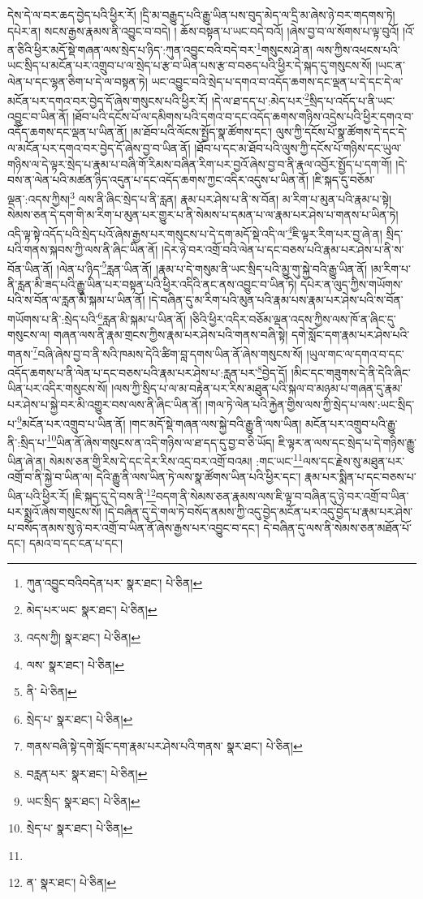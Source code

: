དེས་དེ་ལ་བར་ཆད་བྱེད་པའི་ཕྱིར་རོ། །དྲི་མ་བརྒྱུད་པའི་རྒྱུ་ཡིན་པས་བུད་མེད་ལ་དྲི་མ་ཞེས་ཉེ་བར་གདགས་ཏེ། དཔེར་ན། སངས་རྒྱས་རྣམས་ནི་འབྱུང་བ་བདེ། །
ཆོས་བསྟན་པ་ཡང་བདེ་བའོ། །ཞེས་བྱ་བ་ལ་སོགས་པ་ལྟ་བུའོ། །འོ་ན་ཅིའི་ཕྱིར་མདོ་སྡེ་གཞན་ལས་སྲེད་པ་ཉིད་:ཀུན་འབྱུང་བའི་བདེ་བར་\footnote{ཀུན་འབྱུང་བའིབདེན་པར་  སྣར་ཐང་།  པེ་ཅིན། }གསུངས་ཤེ་ན། ལས་ཀྱིས་འཕངས་པའི་ཡང་སྲིད་པ་མངོན་པར་འགྲུབ་པ་ལ་སྲེད་པ་རྩ་བ་ཡིན་པས་རྩ་བ་བཅད་པའི་ཕྱིར་དེ་སྐད་དུ་གསུངས་སོ། །ཡང་ན་ལེན་པ་དང་ལྷན་ཅིག་པ་དེ་ལ་བསྟན་ཏེ། ཡང་འབྱུང་བའི་སྲེད་པ་དགའ་བ་འདོད་ཆགས་དང་ལྡན་པ་དེ་དང་དེ་ལ་མངོན་པར་དགའ་བར་བྱེད་དོ་ཞེས་གསུངས་པའི་ཕྱིར་རོ། །དེ་ལ་ཐ་དད་པ་:མེད་པར་\footnote{མེད་པར་ཡང་  སྣར་ཐང་།  པེ་ཅིན། }སྲིད་པ་འདོད་པ་ནི་ཡང་འབྱུང་བ་ཡིན་ནོ། །ཐོབ་པའི་དངོས་པོ་ལ་དམིགས་པའི་དགའ་བ་དང་འདོད་ཆགས་གཉིས་འདྲེས་པའི་ཕྱིར་དགའ་བ་འདོད་ཆགས་དང་ལྡན་པ་ཡིན་ནོ། །མ་ཐོབ་པའི་ལོངས་སྤྱོད་སྣ་ཚོགས་དང་། ལུས་ཀྱི་དངོས་པོ་སྣ་ཚོགས་དེ་དང་དེ་ལ་མངོན་པར་དགའ་བར་བྱེད་དོ་ཞེས་བྱ་བ་ཡིན་ནོ། །ཐོབ་པ་དང་མ་ཐོབ་པའི་ལུས་ཀྱི་དངོས་པོ་གཉིས་དང་ཡུལ་གཉིས་ལ་དེ་ལྟར་སྲེད་པ་རྣམ་པ་བཞི་གོ་རིམས་བཞིན་རིག་པར་བྱའོ་ཞེས་བྱ་བ་ནི་རྣལ་འབྱོར་སྤྱོད་པ་དག་གོ། །དེ་བས་ན་ལེན་པའི་མཚན་ཉིད་འདུན་པ་དང་འདོད་ཆགས་ཀྱང་འདིར་འདུས་པ་ཡིན་ནོ། །ཇི་སྐད་དུ་བཅོམ་ལྡན་:འདས་ཀྱིས།\footnote{འདས་ཀྱི།  སྣར་ཐང་།  པེ་ཅིན། } ལས་ནི་ཞིང་སྲེད་པ་ནི་རླན། རྣམ་པར་ཤེས་པ་ནི་ས་བོན། མ་རིག་པ་མུན་པའི་རྣམ་པ་སྟེ། སེམས་ཅན་དེ་དག་གི་མ་རིག་པ་མུན་པར་གྱུར་པ་ནི་སེམས་པ་དམན་པ་ལ་རྣམ་པར་ཤེས་པ་གནས་པ་ཡིན་ཏེ། འདི་ལྟ་སྟེ་འདོད་པའི་སྲེད་པའོ་ཞེས་རྒྱས་པར་གསུངས་པ་དེ་དག་མདོ་སྡེ་འདི་ལ་\footnote{ལས་  སྣར་ཐང་།  པེ་ཅིན། }ཇི་ལྟར་རིག་པར་བྱ་ཞེ་ན། སྲིད་པའི་གནས་སྐབས་ཀྱི་ལས་ནི་ཞིང་ཡིན་ནོ། །དེར་ཉེ་བར་འགྲོ་བའི་ལེན་པ་དང་བཅས་པའི་རྣམ་པར་ཤེས་པ་ནི་ས་བོན་ཡིན་ནོ། །ལེན་པ་ཉིད་\footnote{ནི་  པེ་ཅིན། }རླན་ཡིན་ནོ། །རྣམ་པ་དེ་གསུམ་ནི་ཡང་སྲིད་པའི་མྱུ་གུ་སྐྱེ་བའི་རྒྱུ་ཡིན་ནོ། །མ་རིག་པ་ནི་རླན་མི་ཟད་པའི་རྒྱུ་ཡིན་པར་བསྟན་པའི་ཕྱིར་འདིའི་ནང་ནས་འབྱུང་བ་ཡིན་ཏེ། དཔེར་ན་ལུད་ཀྱིས་གཡོགས་པའི་ས་བོན་ལ་རླན་མི་སྐམ་པ་ཡིན་ནོ། །དེ་བཞིན་དུ་མ་རིག་པའི་མུན་པའི་རྣམ་པས་རྣམ་པར་ཤེས་པའི་ས་བོན་གཡོགས་པ་ནི་:སྲེད་པའི་\footnote{སྲེད་པ་  སྣར་ཐང་།  པེ་ཅིན། }རླན་མི་སྐམ་པ་ཡིན་ནོ། །ཅིའི་ཕྱིར་འདིར་བཅོམ་ལྡན་འདས་ཀྱིས་ལས་ཁོ་ན་ཞིང་དུ་གསུངས་ལ། གཞན་ལས་ནི་རྣམ་གྲངས་ཀྱིས་རྣམ་པར་ཤེས་པའི་གནས་བཞི་སྟེ། དགེ་སློང་དག་རྣམ་པར་ཤེས་པའི་གནས་\footnote{གནས་བཞི་སྟེ་དགེ་སློང་དག་རྣམ་པར་ཤེས་པའི་གནས་  སྣར་ཐང་།  པེ་ཅིན། }བཞི་ཞེས་བྱ་བ་ནི་སའི་ཁམས་དེའི་ཚིག་བླ་དགས་ཡིན་ནོ་ཞེས་གསུངས་སོ། །ཡུལ་གང་ལ་དགའ་བ་དང་འདོད་ཆགས་པ་ནི་ལེན་པ་དང་བཅས་པའི་རྣམ་པར་ཤེས་པ་:རླན་པར་\footnote{བརླན་པར་  སྣར་ཐང་།  པེ་ཅིན། }བྱེད་དོ། །མིང་དང་གཟུགས་དེ་ནི་དེའི་ཞིང་ཡིན་པར་འདིར་གསུངས་སོ། །ལས་ཀྱི་སྲིད་པ་ལ་མ་བརྟེན་པར་རིས་མཐུན་པའི་སྐལ་བ་མཉམ་པ་གཞན་དུ་རྣམ་པར་ཤེས་པ་སྐྱེ་བར་མི་འགྱུར་བས་ལས་ནི་ཞིང་ཡིན་ནོ། །གལ་ཏེ་ལེན་པའི་རྐྱེན་གྱིས་ལས་ཀྱི་སྲེད་པ་ལས་:ཡང་སྲིད་པ་\footnote{ཡང་སྲིད་  སྣར་ཐང་།  པེ་ཅིན། }མངོན་པར་འགྲུབ་པ་ཡིན་ནོ། །གང་མདོ་སྡེ་གཞན་ལས་སྐྱེ་བའི་རྒྱུ་ནི་ལས་ཡིན། མངོན་པར་འགྲུབ་པའི་རྒྱུ་ནི་:སྲིད་པ་\footnote{སྲེད་པ་  སྣར་ཐང་།  པེ་ཅིན། }ཡིན་ནོ་ཞེས་གསུངས་ན་འདི་གཉིས་ལ་ཐ་དད་དུ་བྱ་བ་ཅི་ཡོད། ཇི་ལྟར་ན་ལས་དང་སྲེད་པ་དེ་གཉིས་རྒྱུ་ཡིན་ཞེ་ན། སེམས་ཅན་གྱི་རིས་དེ་དང་དེར་རིས་འདྲ་བར་འགྲོ་བའམ། :གང་ཡང་\footnote{}ལས་དང་རྗེས་སུ་མཐུན་པར་འགྲོ་བ་ནི་སྐྱེ་བ་ཡིན་ལ། དེའི་རྒྱུ་ནི་ལས་ཡིན་ཏེ་ལས་སྣ་ཚོགས་ཡིན་པའི་ཕྱིར་དང་། རྣམ་པར་སྨིན་པ་དང་བཅས་པ་ཡིན་པའི་ཕྱིར་རོ། །ཇི་སྐད་དུ་དེ་བས་ནི་\footnote{ན་  སྣར་ཐང་།  པེ་ཅིན། }བདག་ནི་སེམས་ཅན་རྣམས་ལས་ཇི་ལྟ་བ་བཞིན་དུ་ཉེ་བར་འགྲོ་བ་ཡིན་པར་སྨྲའོ་ཞེས་གསུངས་སོ། །དེ་བཞིན་དུ་དེ་གལ་ཏེ་བསོད་ནམས་ཀྱི་འདུ་བྱེད་མངོན་པར་འདུ་བྱེད་པ་རྣམ་པར་ཤེས་པ་བསོད་ནམས་སུ་ཉེ་བར་འགྲོ་བ་ཡིན་ནོ་ཞེས་རྒྱས་པར་འབྱུང་བ་དང་། དེ་བཞིན་དུ་ལས་ནི་སེམས་ཅན་མཐོན་པོ་དང་། དམའ་བ་དང་ངན་པ་དང་། 